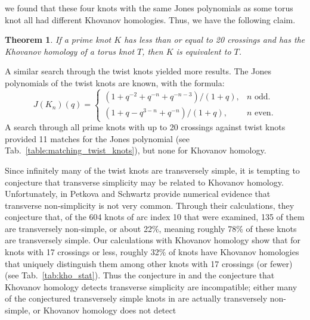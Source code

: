 \documentclass{article}
\theoremstyle{plain}
\newtheorem{theorem}{Theorem}
\begin{document}
        we found that these four knots with the same Jones polynomials as some
        torus knot all had different Khovanov homologies. Thus, we have the
        following claim.
        \begin{theorem}
            If a prime knot $K$ has less than or equal to 20 crossings and has
            the Khovanov homology of a torus knot $T$,
            then $K$ is equivalent to $T$.
        \end{theorem}
        A similar search through the twist knots yielded more results.
        The Jones polynomials of the twist knots are known, with the formula:
        \begin{equation}
            J(K_{n})(q)=
            \begin{cases}
                (1+q^{-2}+q^{-n}+q^{-n-3})/(1+q),&n\textrm{ odd.}\\
                (1+q-q^{3-n}+q^{-n})/(1+q),&n\textrm{ even.}
            \end{cases}
        \end{equation}
        A search through all prime knots with up to 20 crossings against twist
        knots provided 11 matches for the Jones polynomial
        (see Tab.~\ref{table:matching_twist_knots}), but
        none for Khovanov homology.
        \par\hfill\par
        Since infinitely many of the twist knots are transversely simple, it is
        tempting to conjecture that transverse simplicity may be related to
        Khovanov homology.
        Unfortunately, in \cite{Petkova02012026} Petkova and Schwartz provide
        numerical evidence that transverse non-simplicity is not very common.
        Through their calculations, they conjecture that, of the 604 knots of
        arc index 10 that were examined, 135 of them are transversely
        non-simple, or about 22\%, meaning roughly 78\% of these knots are
        transversely simple. Our calculations with Khovanov homology show that
        for knots with 17 crossings or less, roughly 32\% of knots have
        Khovanov homologies that uniquely distinguish them among other knots
        with 17 crossings (or fewer) (see Tab.~\ref{tab:kho_stat}).
        Thus the conjecture in \cite{Petkova02012026} and
        the conjecture that Khovanov homology detects transverse simplicity
        are incompatible; either many of the conjectured
        transversely simple knots in \cite{Petkova02012026} are actually
        transversely non-simple, or Khovanov homology does not detect
\end{document}
